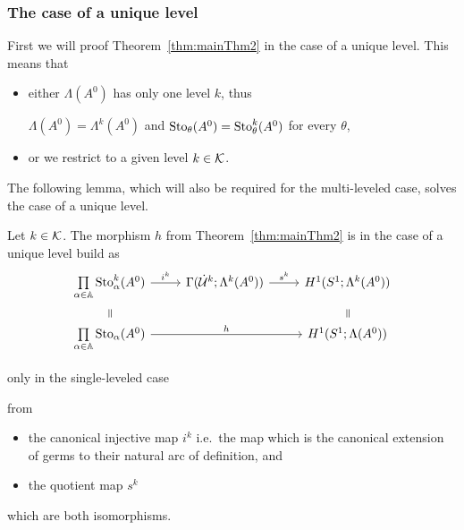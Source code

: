 \subsubsection{The case of a unique level}
First we will proof Theorem~\ref{thm:mainThm2} in the case of a unique level.
This means that
\begin{itemize}
  \item either $\Lambda(A^0)$ has only one level $k$, thus
    \begin{einr}
      $\Lambda(A^0)=\Lambda^k(A^0)$ and $\operatorname{Sto}_\theta(A^0)=\operatorname{Sto}_\theta^k(A^0)$
      for every $\theta$,
    \end{einr}
  \item or we restrict to a given level $k\in\mathcal{K}$.
\end{itemize}
The following lemma, which will also be required for the multi-leveled case,
solves the case of a unique level.
\begin{lem}\label{lem:solutionOfSingleLeveledCase}
  Let $k\in\mathcal{K}$.
  The morphism $h$ from Theorem~\ref{thm:mainThm2} is in the case of a unique
  level build as
  \[ \begin{tikzcd}[row sep=0cm]
    \underset{\alpha\in\A}\prod\Sto_\alpha^k(A^0)
    \rar{i^k}
    & \Gamma(\dot\cU^k;\Lambda^k(A^0))
    \rar{s^k}
    & H^1(S^1;\Lambda^k(A^0))
    \\
    \text{\rotatebox[origin=c]{-90}{$=$}}
    \tikzmark{e1}
    &&
    \tikzmark{e2}
    \text{\rotatebox[origin=c]{-90}{$=$}}
    \\
    \underset{\alpha\in\A}\prod\Sto_\alpha(A^0)
    \arrow{rr}{h}
    && H^1(S^1;\Lambda(A^0))
  \end{tikzcd} \]
  \begin{flushright}
     only in the single-leveled case
  \end{flushright}
  from
  \begin{itemize}
  \item the canonical injective map $i^k$ i.e.\ the map which is the canonical
    extension of germs to their natural arc of definition, and
  \item the quotient map $s^k$
  \end{itemize}
  which are both isomorphisms.
\end{lem}
